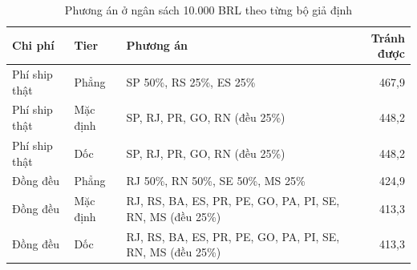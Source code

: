 \documentclass[12pt,a4paper]{report}
\renewcommand{\_}{\oldunderscore\allowbreak}
\begin{document}
\begin{table}[H]
\centering\small
\caption{Phương án ở ngân sách 10.000 BRL theo từng bộ giả định}
\begin{tabular}{llL{7.8cm}r}
\toprule
Chi phí & Tier & Phương án & Tránh được \\
\midrule
Phí ship thật & Phẳng & SP 50\%, RS 25\%, ES 25\% & 467,9 \\
Phí ship thật & Mặc định & SP, RJ, PR, GO, RN (đều 25\%) & 448,2 \\
Phí ship thật & Dốc & SP, RJ, PR, GO, RN (đều 25\%) & 448,2 \\
Đồng đều & Phẳng & RJ 50\%, RN 50\%, SE 50\%, MS 25\% & 424,9 \\
Đồng đều & Mặc định & RJ, RS, BA, ES, PR, PE, GO, PA, PI, SE, RN, MS (đều 25\%) & 413,3 \\
Đồng đều & Dốc & RJ, RS, BA, ES, PR, PE, GO, PA, PI, SE, RN, MS (đều 25\%) & 413,3 \\
\bottomrule
\end{tabular}
\end{table}
\end{document}
